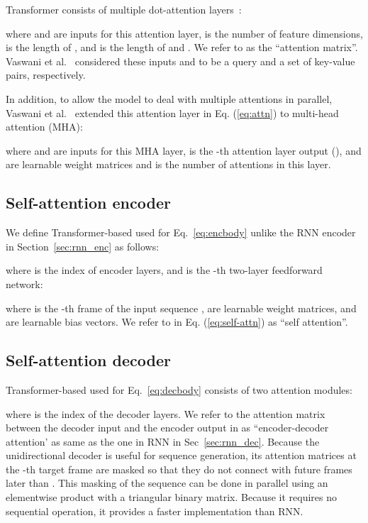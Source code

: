 Transformer consists of multiple dot-attention layers~\cite{luong-dot-att-D15-1166}:

where  and  are inputs for this attention layer,  is the number of feature dimensions,  is the length of , and  is the length of  and . We refer to  as the ``attention matrix''.
Vaswani et al.~\cite{VaswaniNIPS2017_7181} considered these inputs  and  to be a query and a set of key-value pairs, respectively.

In addition, to allow the model to deal with multiple attentions in parallel, Vaswani et al.~\cite{VaswaniNIPS2017_7181} extended this attention layer in Eq. (\ref{eq:attn}) to multi-head attention (MHA):

where  and  are inputs for this MHA layer,  is the -th attention layer output (),   and  are learnable weight matrices and  is the number of attentions in this layer.

\subsection{Self-attention encoder}
We define Transformer-based  used for Eq.~\eqref{eq:encbody} unlike the RNN encoder in Section~\ref{sec:rnn_enc} as follows:

where  is the index of encoder layers,
and  is the -th two-layer feedforward network:

where  is the -th frame of the input sequence ,  are learnable weight matrices, and  are learnable bias vectors.
We refer to  in Eq. (\ref{eq:self-attn}) as ``self attention''. 


\subsection{Self-attention decoder}

Transformer-based  used for Eq.~\eqref{eq:decbody} consists of two attention modules:

where  is the index of the decoder layers. We refer to the attention matrix between the decoder input and the encoder output in  as ``encoder-decoder attention' as same as the one in RNN in Sec~\ref{sec:rnn_dec}.
Because the unidirectional decoder is useful for sequence generation, its attention matrices at the -th target frame are masked so that they do not connect with future frames later than .
This masking of the sequence can be done in parallel using an elementwise product with a triangular binary matrix. Because it requires no sequential operation, it provides a faster implementation than RNN.




